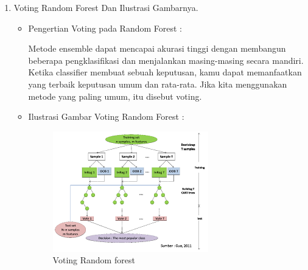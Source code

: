 \begin{enumerate}
\par
\par
\item Voting Random Forest Dan Ilustrasi Gambarnya.
\par
\begin{itemize}
\item Pengertian Voting pada Random Forest	:
\par Metode ensemble dapat mencapai akurasi tinggi dengan membangun beberapa pengklasifikasi dan menjalankan
masing-masing secara mandiri. Ketika classifier membuat sebuah keputusan, kamu dapat memanfaatkan yang terbaik
keputusan umum dan rata-rata. Jika kita menggunakan metode yang paling umum, itu disebut voting.
\item Ilustrasi Gambar Voting Random Forest :
\begin{figure}[ht]
\centering
\includegraphics[scale=1]{figures/aku2.png}
\caption{Voting Random forest}
\label{contoh}
\end{figure}
\end{itemize}
\end{enumerate}

